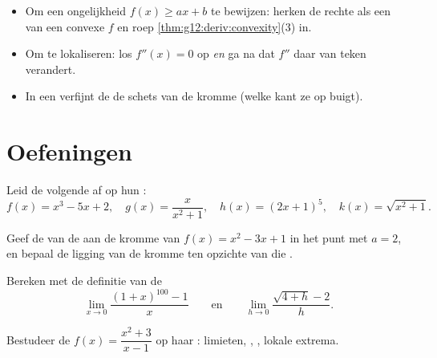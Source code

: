 \begin{method}\label{met:g12:deriv:convexity}
\begin{itemize}
  \item Om een ongelijkheid $f(x) \geq ax + b$ te bewijzen: herken de rechte
        als een  van een convexe $f$ en roep
        \cref{thm:g12:deriv:convexity}(3) in.
  \item Om  te lokaliseren: los $f''(x) = 0$ op \emph{en} ga na dat
        $f''$ daar van teken verandert.
  \item In een  verfijnt de  de schets van de kromme
        (welke kant ze op buigt).
\end{itemize}
\end{method}

\section{Oefeningen}

\begin{exercise}[$\star$]\label{exo:g12:deriv:1}
Leid de volgende  af op hun :
\[
f(x) = x^3 - 5x + 2, \quad
g(x) = \frac{x}{x^2+1}, \quad
h(x) = (2x+1)^5, \quad
k(x) = \sqrt{x^2 + 1}.
\]
\end{exercise}

\begin{exercise}[$\star$]\label{exo:g12:deriv:2}
Geef de  van de  aan de kromme van $f(x) = x^2 - 3x + 1$
in het punt met  $a = 2$, en bepaal de ligging van de kromme ten
opzichte van die .
\end{exercise}

\begin{exercise}[$\star$]\label{exo:g12:deriv:3}
Bereken met de definitie van de 
\[
\lim_{x \to 0} \frac{(1+x)^{100} - 1}{x}
\qquad\text{en}\qquad
\lim_{h \to 0} \frac{\sqrt{4+h} - 2}{h}.
\]
\end{exercise}

\begin{exercise}[$\star\star$]\label{exo:g12:deriv:4}
Bestudeer de  $f(x) = \dfrac{x^2 + 3}{x - 1}$ op haar :
limieten, , , lokale extrema.
\end{exercise}

